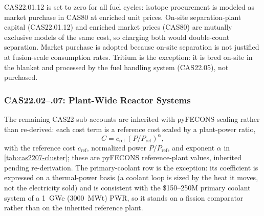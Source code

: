 \documentclass{article}
\begin{document}
CAS22.01.12 is set to zero for all fuel cycles: isotope procurement is
modeled as market purchase in CAS80 at enriched unit prices. On-site
separation-plant capital (CAS22.01.12) and enriched market prices (CAS80)
are mutually exclusive models of the same cost, so charging both would
double-count separation. Market purchase is adopted because on-site
separation is not justified at fusion-scale consumption rates. Tritium is
the exception: it is bred on-site in the blanket and processed by the fuel
handling system (CAS22.05), not purchased.


\subsubsection{CAS22.02--.07: Plant-Wide Reactor Systems}
\label{sec:cas2207-cluster}

The remaining CAS22 sub-accounts are inherited with pyFECONS scaling
rather than re-derived: each cost term is a reference cost scaled by a
plant-power ratio,
\begin{equation}
\label{eq:cas2207-scaling}
C = c_{\text{ref}}\,(P/P_{\text{ref}})^{\alpha},
\end{equation}
with the reference cost $c_{\text{ref}}$, normalized power
$P/P_{\text{ref}}$, and exponent $\alpha$ in \cref{tab:cas2207-cluster};
these are pyFECONS reference-plant values, inherited pending re-derivation.
The primary-coolant row is the exception: its coefficient is expressed on
a thermal-power basis (a coolant loop is sized by the heat it moves, not
the electricity sold) and is consistent with the \$150--250M primary
coolant system of a 1~GWe (3000~MWt) PWR, so it stands on a fission
comparator rather than on the inherited reference plant.
\end{document}
